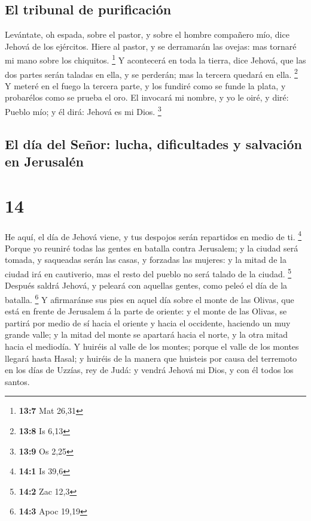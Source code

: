 \hypertarget{el-tribunal-de-purificaciuxf3n}{%
\subsection{El tribunal de
purificación}\label{el-tribunal-de-purificaciuxf3n}}

 Levántate, oh espada, sobre el pastor, y sobre el hombre
compañero mío, dice Jehová de los ejércitos. Hiere al pastor, y se
derramarán las ovejas: mas tornaré mi mano sobre los chiquitos.
\footnote{\textbf{13:7} Mat 26,31}  Y acontecerá en toda la
tierra, dice Jehová, que las dos partes serán taladas en ella, y se
perderán; mas la tercera quedará en ella. \footnote{\textbf{13:8} Is
  6,13}  Y meteré en el fuego la tercera parte, y los
fundiré como se funde la plata, y probarélos como se prueba el oro. El
invocará mi nombre, y yo le oiré, y diré: Pueblo mío; y él dirá: Jehová
es mi Dios. \footnote{\textbf{13:9} Os 2,25}

\hypertarget{el-duxeda-del-seuxf1or-lucha-dificultades-y-salvaciuxf3n-en-jerusaluxe9n}{%
\subsection{El día del Señor: lucha, dificultades y salvación en
Jerusalén}\label{el-duxeda-del-seuxf1or-lucha-dificultades-y-salvaciuxf3n-en-jerusaluxe9n}}

\hypertarget{section-13}{%
\section{14}\label{section-13}}

 He aquí, el día de Jehová viene, y tus despojos serán
repartidos en medio de ti. \footnote{\textbf{14:1} Is 39,6} 
Porque yo reuniré todas las gentes en batalla contra Jerusalem; y la
ciudad será tomada, y saqueadas serán las casas, y forzadas las mujeres:
y la mitad de la ciudad irá en cautiverio, mas el resto del pueblo no
será talado de la ciudad. \footnote{\textbf{14:2} Zac 12,3} 
Después saldrá Jehová, y peleará con aquellas gentes, como peleó el día
de la batalla. \footnote{\textbf{14:3} Apoc 19,19}  Y
afirmaránse sus pies en aquel día sobre el monte de las Olivas, que está
en frente de Jerusalem á la parte de oriente: y el monte de las Olivas,
se partirá por medio de sí hacia el oriente y hacia el occidente,
haciendo un muy grande valle; y la mitad del monte se apartará hacia el
norte, y la otra mitad hacia el mediodía.  Y huiréis al
valle de los montes; porque el valle de los montes llegará hasta Hasal;
y huiréis de la manera que huisteis por causa del terremoto en los días
de Uzzías, rey de Judá: y vendrá Jehová mi Dios, y con él todos los
santos.

